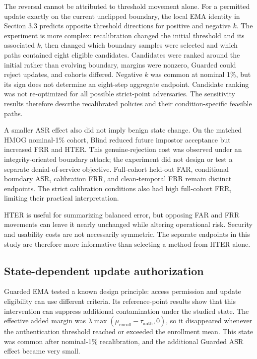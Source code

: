 \documentclass[technologies,article,submit,moreauthors]{Definitions/mdpi}
\begin{document}
The reversal cannot be attributed to threshold movement alone. For a permitted update exactly on the current unclipped boundary, the local EMA identity in Section 3.3 predicts opposite threshold directions for positive and negative \(k\). The experiment is more complex: recalibration changed the initial threshold and its associated \(k\), then changed which boundary samples were selected and which paths contained eight eligible candidates. Candidates were ranked around the initial rather than evolving boundary, margins were nonzero, Guarded could reject updates, and cohorts differed. Negative \(k\) was common at nominal 1\%, but its sign does not determine an eight-step aggregate endpoint. Candidate ranking was not re-optimized for all possible strict-point adversaries. The sensitivity results therefore describe recalibrated policies and their condition-specific feasible paths.

A smaller ASR effect also did not imply benign state change. On the matched HMOG nominal-1\% cohort, Blind reduced future impostor acceptance but increased FRR and HTER. This genuine-rejection cost was observed under an integrity-oriented boundary attack; the experiment did not design or test a separate denial-of-service objective. Full-cohort held-out FAR, conditional boundary ASR, calibration FRR, and clean-temporal FRR remain distinct endpoints. The strict calibration conditions also had high full-cohort FRR, limiting their practical interpretation.

HTER is useful for summarizing balanced error, but opposing FAR and FRR movements can leave it nearly unchanged while altering operational risk. Security and usability costs are not necessarily symmetric. The separate endpoints in this study are therefore more informative than selecting a method from HTER alone.

\subsection{State-dependent update authorization}\label{sec:state-dependent-update-authorization}

Guarded EMA tested a known design principle: access permission and update eligibility can use different criteria. Its reference-point results show that this intervention can suppress additional contamination under the studied state. The effective added margin was \(\lambda\max(\mu_{\mathrm{enroll}}-\tau_{\mathrm{auth}},0)\), so it disappeared whenever the authentication threshold reached or exceeded the enrollment mean. This state was common after nominal-1\% recalibration, and the additional Guarded ASR effect became very small.
\end{document}

